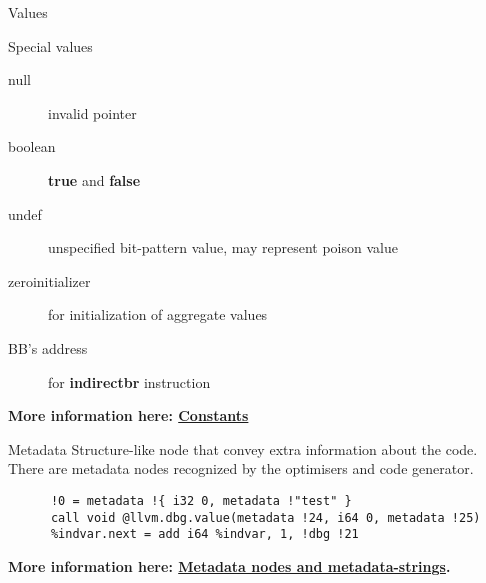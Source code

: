 \documentclass[8pt]{beamer}
\begin{document}
\begin{frame}[fragile]{Values}
  \begin{block}{Special values}
    \begin{description}
      \item[null] invalid pointer
      \item[boolean] \textbf{true} and \textbf{false}
      \item[undef] unspecified bit-pattern value, may represent poison value
      \item[zeroinitializer] for initialization of aggregate values
      \item[BB's address] for \textbf{indirectbr} instruction
    \end{description}
    \textbf{More information here:
      \href{http://llvm.org/docs/LangRef.html\#constants}{Constants}}
  \end{block}

  \begin{block}{Metadata}
    Structure-like node that convey extra information about the code. There
    are metadata nodes recognized by the optimisers and code generator.
    \begin{verbatim}
      !0 = metadata !{ i32 0, metadata !"test" }
      call void @llvm.dbg.value(metadata !24, i64 0, metadata !25)
      %indvar.next = add i64 %indvar, 1, !dbg !21
    \end{verbatim}
    \textbf{More information here:
      \href{http://llvm.org/docs/LangRef.html\#metadata-nodes-and-metadata-strings}{Metadata
        nodes and metadata-strings}.}
  \end{block}
\end{frame}
\end{document}

